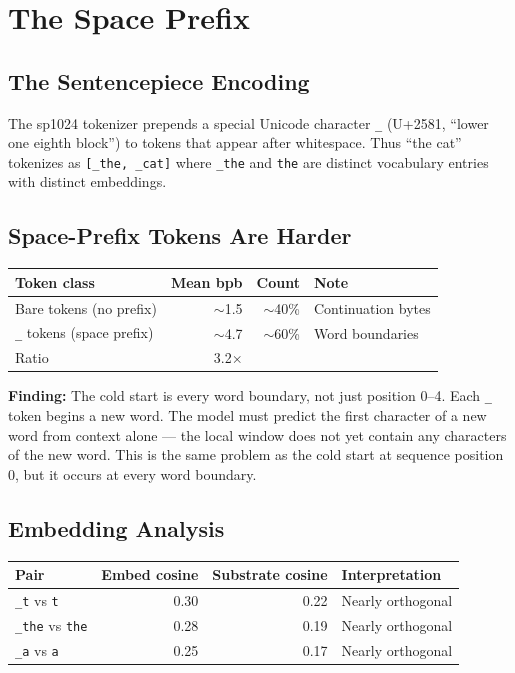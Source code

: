 \documentclass[11pt,a4paper]{report}
\newcommand{\finding}[1]{\textcolor{finding}{\textbf{Finding:}} #1}
\begin{document}
\chapter{The Space Prefix}

\section{The Sentencepiece Encoding}

The sp1024 tokenizer prepends a special Unicode character \texttt{\_} (U+2581, ``lower one eighth block'') to tokens that appear after whitespace. Thus ``the cat'' tokenizes as \texttt{[\_the, \_cat]} where \texttt{\_the} and \texttt{the} are distinct vocabulary entries with distinct embeddings.

\section{Space-Prefix Tokens Are Harder}

\begin{center}
\begin{tabular}{lrrl}
\toprule
Token class & Mean bpb & Count & Note \\
\midrule
Bare tokens (no prefix) & $\sim$1.5 & $\sim$40\% & Continuation bytes \\
\texttt{\_} tokens (space prefix) & $\sim$4.7 & $\sim$60\% & Word boundaries \\
Ratio & 3.2$\times$ & & \\
\bottomrule
\end{tabular}
\end{center}

\finding{The cold start is every word boundary, not just position 0--4.} Each \texttt{\_} token begins a new word. The model must predict the first character of a new word from context alone --- the local window does not yet contain any characters of the new word. This is the same problem as the cold start at sequence position 0, but it occurs at every word boundary.

\section{Embedding Analysis}

\begin{center}
\begin{tabular}{lrrl}
\toprule
Pair & Embed cosine & Substrate cosine & Interpretation \\
\midrule
\texttt{\_t} vs \texttt{t} & 0.30 & 0.22 & Nearly orthogonal \\
\texttt{\_the} vs \texttt{the} & 0.28 & 0.19 & Nearly orthogonal \\
\texttt{\_a} vs \texttt{a} & 0.25 & 0.17 & Nearly orthogonal \\
\bottomrule
\end{tabular}
\end{center}
\end{document}
